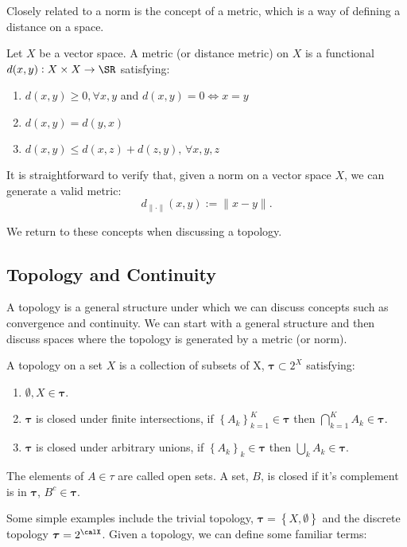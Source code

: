 Closely related to a norm is the concept of a metric, which is a way of defining a distance on a space. 
\begin{definition}[Metric]
	\label{def:metric}
	Let \(X\) be a vector space. A metric (or distance metric) on \(X\) is a functional  \(d(x,y): X \times X \to \SR\) satisfying:
	 \begin{enumerate}
		 \item \(d(x,y)\geq 0,\forall x,y\) and \(d(x,y) = 0 \iff x = y\)
		 \item \(d(x,y) = d(y,x)\)
		 \item \(d(x,y) \leq d(x,z) + d(z,y),\,\forall x,y,z\)
	\end{enumerate}
\end{definition}

It is straightforward to verify that, given a norm on a vector space \(X\), we can generate a valid metric:
 \[
	 d_{\|\cdot\|}(x,y) := \|x-y\|
.\]

We return to these concepts when discussing a topology. 

\subsection{Topology and Continuity}%
\label{subsec:topology}

A topology is a general structure under which we can discuss concepts such as convergence and continuity. We can start with a general structure and then discuss spaces where the topology is generated by a metric (or norm).

\begin{definition}[Topology]
	\label{def:topology}
	A topology on a set \(X\) is a collection of subsets of X, \(\boldsymbol{\tau} \subset 2^X\) satisfying:
	\begin{enumerate}
		\item \(\emptyset, X \in \boldsymbol{\tau}\).
		\item \(\boldsymbol{\tau}\) is closed under finite intersections, if \(\left\{A_k\right\}_{k=1}^K \in \boldsymbol{\tau}\) then \(\bigcap_{k=1}^K A_k \in \boldsymbol{\tau}\).
		\item \(\boldsymbol{\tau}\) is closed under arbitrary unions, if \(\left\{A_k\right\}_k \in \boldsymbol{\tau}\) then \(\bigcup_k A_k \in \boldsymbol{\tau}\).
	\end{enumerate}
	The elements of \(A\in\tau\) are called open sets. A set, \(B\), is closed if it's complement is in \(\boldsymbol{\tau}\), \(B^c \in \boldsymbol{\tau}\).
\end{definition}
Some simple examples include the trivial topology, \(\boldsymbol{\tau} = \left\{X, \emptyset\right\}\) and the discrete topology  \(\boldsymbol{\tau} = 2^\calX\). Given a topology, we can define some familiar terms:


